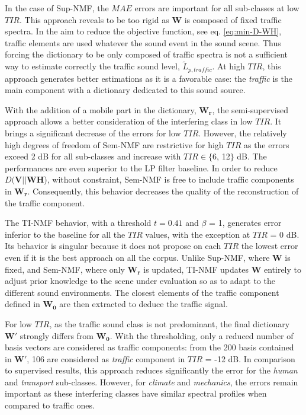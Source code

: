 \documentclass[twocolumn]{svjour3}          %
\begin{document}
In the case of Sup-NMF, the $MAE$ errors are important for all sub-classes at low $TIR$. This approach reveals to be too rigid as $\mathbf{W}$ is composed of fixed traffic spectra. In the aim to reduce the objective function, see eq. \ref{eq:min-D-WH}, traffic elements are used whatever the sound event in the sound scene. Thus forcing the dictionary to be only composed of traffic spectra is not a sufficient way to estimate correctly the traffic sound level, $\tilde{L}_{p,traffic}$. At high $TIR$, this approach generates better estimations as it is a favorable case: the \textit{traffic} is the main component with a dictionary dedicated to this sound source.

With the addition of a mobile part in the dictionary, $\mathbf{W_r}$, the semi-supervised approach allows a better consideration of the interfering class in low $TIR$. It brings a significant decrease of the errors for low $TIR$. However, the relatively high degrees of freedom of Sem-NMF are restrictive for high $TIR$ as the errors exceed 2 dB for all sub-classes and increase with $TIR \in \lbrace$6, 12$\rbrace$ dB. The performances are even superior to the LP filter baseline. In order to reduce $D(\mathbf{V} \vert \vert \mathbf{WH}$), without constraint, Sem-NMF is free to include traffic components in $\mathbf{W_r}$. Consequently, this behavior decreases the quality of the reconstruction of the traffic component.

The TI-NMF behavior, with a threshold $t = 0.41$ and $\beta$ = 1, generates error inferior to the baseline for all the $TIR$ values, with the exception at $TIR$ = 0 dB. Its behavior is singular because it does not propose on each $TIR$ the lowest error even if it is the best approach on all the corpus. Unlike Sup-NMF, where $\mathbf{W}$ is fixed, and Sem-NMF, where only $\mathbf{W_r}$ is updated, TI-NMF updates $\mathbf{W}$ entirely to adjust prior knowledge to the scene under evaluation so as to adapt to the different sound environments. The closest elements of the traffic component defined in $\mathbf{W_0}$ are then extracted to deduce the traffic signal.

For low $TIR$, as the traffic sound class is not predominant, the final dictionary $\mathbf{W'}$ strongly differs from $\mathbf{W_0}$. With the thresholding, only a reduced number of basis vectors are considered as traffic components: from the 200 basis contained in $\mathbf{W'}$, 106 are considered as \textit{traffic}  component in $TIR$ = -12 dB. In comparison to supervised results, this approach reduces significantly the error for the \textit{human} and \textit{transport} sub-classes.  However, for \textit{climate} and \textit{mechanics}, the errors remain important as these interfering classes have similar spectral profiles when compared to traffic ones.
\end{document}
